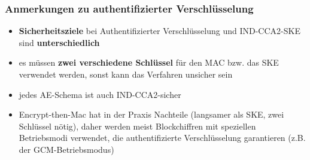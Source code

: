 \documentclass[12pt,A4]{extarticle}
\begin{document}
\subsubsection{Anmerkungen zu authentifizierter Verschlüsselung}
\begin{itemize}
  \item{\textbf{Sicherheitsziele} bei Authentifizierter Verschlüsselung und IND-CCA2-SKE sind \textbf{unterschiedlich}}
  \item{es müssen \textbf{zwei verschiedene Schlüssel} für den MAC bzw. das SKE verwendet werden, sonst kann das Verfahren unsicher sein}
  \item{jedes AE-Schema ist auch IND-CCA2-sicher}
  \item{Encrypt-then-Mac hat in der Praxis Nachteile (langsamer als SKE, zwei Schlüssel nötig), daher werden meist Blockchiffren mit speziellen Betriebsmodi verwendet, die authentifizierte Verschlüsselung garantieren (z.B. der GCM-Betriebsmodus)}
\end{itemize}

\newpage


\end{document}

